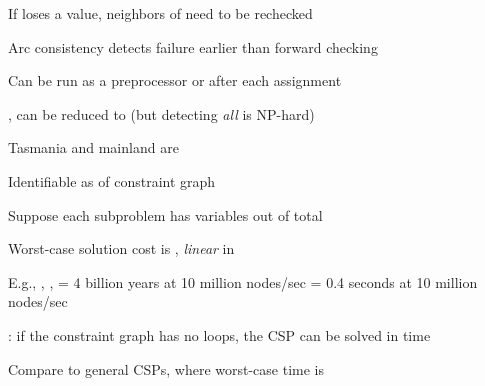 \documentclass{article}
\begin{document}
\begin{huge}
\vspace*{0.1in}

\maxfigwidth
{}

If  loses a value, neighbors of  need to be rechecked

Arc consistency detects failure earlier than forward checking

Can be run as a preprocessor or after each assignment







, can be reduced to 
(but detecting \emph{all} is NP-hard)


\vspace*{-0.4in}

\textwidth
{}

Tasmania and mainland are 

Identifiable as  of constraint graph


Suppose each subproblem has  variables out of  total

Worst-case solution cost is , \emph{linear} in 

E.g., , , \al
   = 4 billion years at 10 million nodes/sec\al
   = 0.4 seconds at 10 million nodes/sec



\vspace*{0.3in}

\textwidth
{}

: if the constraint graph has no loops, the CSP can be solved in 
 time

Compare to general CSPs, where worst-case time is 


\end{huge}
\end{document}
